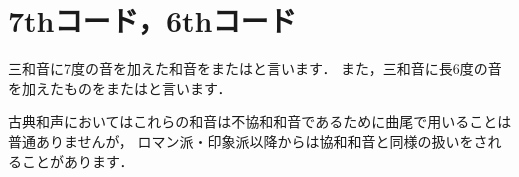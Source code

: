 \documentclass[dvipdfmx,uplatex,b5paper,openany,jbase=12Q,nomag*,textwidth-limit=44%
               ]{gachimuchi}[2020/05/05]
\begin{document}
\begin{comment}
\paragraph{第三位の連結}
第三位の連結に区分される和音連結は次のものと定めています．
\begin{itemize}
  \item 2度による連結（悪い音度に到達するもの）
  \item 3度上行による連結（悪い音度に到達するもの）
\end{itemize}
ただし最後のものは後続和音が弱拍にある場合には用いてよいとしています．
\end{comment}

\chapter{7thコード，6thコード}
三和音に7度の音を加えた和音をまたは\xkanjispace{}と言います．
また，三和音に長6度の音を加えたものをまたは\xkanjispace{}と言います．


古典和声においてはこれらの和音は不協和和音であるために曲尾で用いることは普通ありませんが，
ロマン派・印象派以降からは協和和音と同様の扱いをされることがあります．
\end{document}
